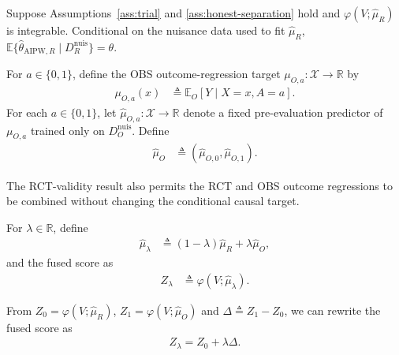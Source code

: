 \begin{corollary}
\label{cor:rct-only-aipw}
	Suppose Assumptions~\ref{ass:trial} and \ref{ass:honest-separation} hold and
	$\varphi(V;\widehat\mu_R)$ is integrable. Conditional on the nuisance data
	used to fit $\widehat\mu_R$,
	$\mathbb E\{\widehat\theta_{\mathrm{AIPW},R}\mid D_R^{\mathrm{nuis}}\}=\theta$.
\end{corollary}

For $a\in\{0,1\}$, define the OBS outcome-regression target $\mu_{O,a}:\mathcal X\to\mathbb R$ by
\begin{align*}
	\mu_{O,a}(x) &\triangleq \mathbb E_O[Y\mid X=x,A=a].
\end{align*}
For each $a\in\{0,1\}$, let $\widehat\mu_{O,a}:\mathcal X\to\mathbb R$ denote a fixed pre-evaluation predictor of $\mu_{O,a}$ trained only on $D_O^{\mathrm{nuis}}$. Define
\begin{align}
	\widehat\mu_O &\triangleq (\widehat\mu_{O,0},\widehat\mu_{O,1}).
	\label{eq:obs-outcome-regression}
\end{align}

The RCT-validity result also permits the RCT and OBS outcome regressions to be
combined without changing the conditional causal target.
\begin{definition}
\label{def:fusion-score}
	For $\lambda\in\mathbb R$, define
	\begin{align}
		\widehat{\mu}_{\lambda} &\triangleq (1-\lambda)\widehat\mu_R+\lambda\widehat\mu_O, \label{eq:fused-regression}
	\end{align}
	and the fused score as
	\begin{align}
		Z_{\lambda} &\triangleq \varphi(V;\widehat\mu_\lambda).
		\label{eq:fusion-score}
	\end{align}
\end{definition}
From $Z_0 = \varphi(V;\widehat\mu_R)$, $Z_1 = \varphi(V;\widehat\mu_O)$ and $\Delta \triangleq Z_1-Z_0$, we can rewrite the fused score as
\begin{align}
	Z_{\lambda} = Z_0 + \lambda \Delta.
\end{align}

